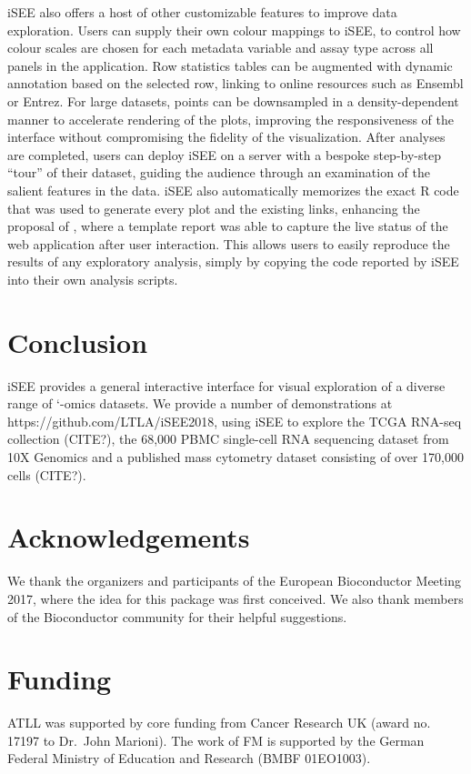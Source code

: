 \documentclass{bioinfo}
\begin{document}
iSEE also offers a host of other customizable features to improve data exploration. 
Users can supply their own colour mappings to iSEE, to control how colour scales are chosen for each metadata variable and assay type across all panels in the application.
Row statistics tables can be augmented with dynamic annotation based on the selected row, linking to online resources such as Ensembl or Entrez. %
For large datasets, points can be downsampled in a density-dependent manner to accelerate rendering of the plots, improving the responsiveness of the interface without compromising the fidelity of the visualization. 
After analyses are completed, users can deploy iSEE on a server with a bespoke step-by-step ``tour'' of their dataset, guiding the audience through an examination of the salient features in the data.
iSEE also automatically memorizes the exact R code that was used to generate every plot and the existing links, 
enhancing the proposal of \citep{marini2016interrepro}, where a template report was able to capture the live status of the web application after user interaction.
This allows users to easily reproduce the results of any exploratory analysis, simply by copying the code reported by iSEE into their own analysis scripts. 

\section{Conclusion}
iSEE provides a general interactive interface for visual exploration of a diverse range of `-omics datasets. 
We provide a number of demonstrations at https://github.com/LTLA/iSEE2018, using iSEE to explore the TCGA RNA-seq collection (CITE?), the 68,000 PBMC single-cell RNA sequencing dataset from 10X Genomics \citep{zheng2017massively} and a published mass cytometry dataset consisting of over 170,000 cells (CITE?). 

\section*{Acknowledgements}
We thank the organizers and participants of the European Bioconductor Meeting 2017, where the idea for this package was first conceived.
We also thank members of the Bioconductor community for their helpful suggestions. 
\vspace*{-12pt}

\section*{Funding}
ATLL was supported by core funding from Cancer Research UK (award no. 17197 to Dr.\ John Marioni).
The work of FM is supported by the German Federal Ministry of Education and Research (BMBF 01EO1003).
\vspace*{-12pt}

%
%

%
%
%
%
%

\end{document}
